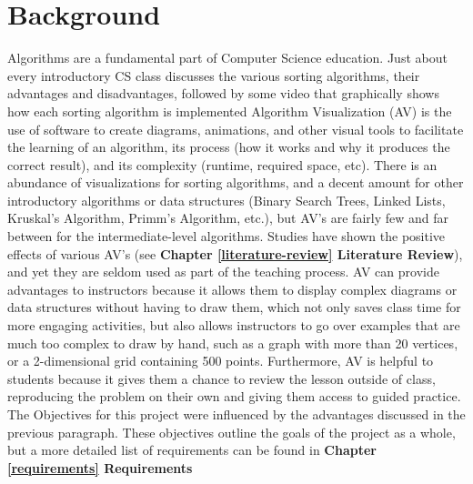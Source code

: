 \section{Background}
\label{introduction}
\hspace{-0.26in}
Algorithms are a fundamental part of Computer Science education. 
Just about every introductory CS class discusses the various sorting algorithms, 
their advantages and disadvantages, followed by some video that graphically 
shows how each sorting algorithm is implemented
\newline\newline
Algorithm Visualization (AV) is the use of software 
to create diagrams, animations, and other visual tools 
to facilitate the learning of an algorithm, 
its process (how it works and why it produces the correct result), 
and its complexity (runtime, required space, etc).
There is an abundance of visualizations for sorting algorithms,
and a decent amount for other introductory algorithms or data structures
(Binary Search Trees, Linked Lists, Kruskal's Algorithm, Primm's Algorithm, etc.),
but AV's are fairly few and far between for the intermediate-level algorithms. 
\newline\newline
Studies have shown the positive effects of various AV's 
(see {\textbf{Chapter \ref{literature-review} Literature Review}}),
and yet they are seldom used as part of the teaching process.
AV can provide advantages to instructors because it allows them to 
display complex diagrams or data structures without having to draw them, 
which not only saves class time for more engaging activities, but also
allows instructors to go over examples that are 
much too complex to draw by hand, such as a graph with more than 20 vertices, 
or a 2-dimensional grid containing 500 points. 
Furthermore, AV is helpful to students because it gives them a chance to 
review the lesson outside of class, reproducing the problem on their own
and giving them access to guided practice. 
\newline\newline
The Objectives for this project were influenced by the advantages discussed in the previous paragraph. 
These objectives outline the goals of the project as a whole, but 
a more detailed list of requirements can be found in
\textbf{Chapter \ref{requirements} Requirements}
